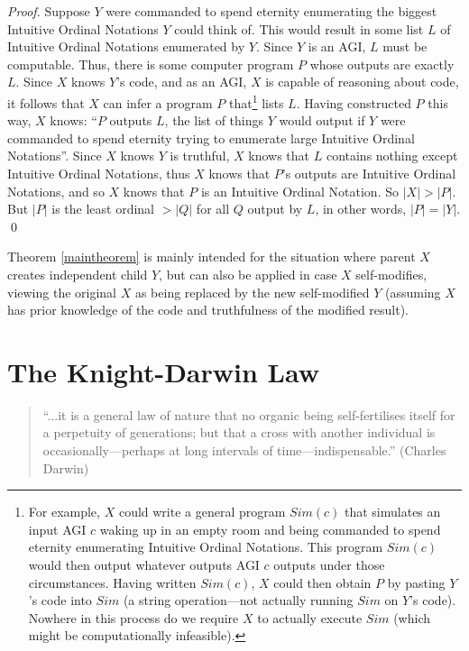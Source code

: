 \documentclass[runningheads]{llncs}
\begin{document}
\begin{proof}
    Suppose $Y$ were commanded to
    spend eternity enumerating the biggest Intuitive Ordinal Notations $Y$ could
    think of. This would result in some list $L$ of Intuitive Ordinal Notations
    enumerated by $Y$. Since $Y$ is an AGI, $L$ must be computable. Thus, there
    is some computer program
    $P$ whose outputs are exactly $L$.
    Since $X$ knows $Y$'s code,
    and as an AGI, $X$ is capable of reasoning about code,
    it follows that $X$ can infer a program $P$ that\footnote{For example,
    $X$ could write a general program $Sim(c)$ that simulates an input AGI $c$
    waking up in an empty room and being commanded
    to spend eternity enumerating Intuitive Ordinal Notations. This program $Sim(c)$
    would then output whatever outputs AGI $c$ outputs under those
    circumstances. Having written $Sim(c)$, $X$ could then obtain $P$ by
    pasting $Y$'s code into $Sim$ (a string operation---not actually running $Sim$
    on $Y$'s code).
    Nowhere in this process do we require $X$ to actually
    execute $Sim$ (which might be computationally infeasible).} lists $L$.
    Having constructed $P$ this way, $X$ knows: ``$P$ outputs
    $L$, the list of things $Y$ would output if $Y$ were commanded to spend eternity
    trying to enumerate large Intuitive Ordinal Notations''.
    Since $X$ knows $Y$ is truthful,
    $X$ knows that $L$ contains nothing except Intuitive Ordinal Notations,
    thus $X$ knows that $P$'s outputs are Intuitive Ordinal Notations,
    and so $X$ knows that $P$ is an Intuitive Ordinal Notation.
    So $|X|>|P|$. But $|P|$ is
    the least ordinal $>|Q|$ for all $Q$ output by $L$, in other words,
    $|P|=|Y|$.
    \qed
\end{proof}

Theorem \ref{maintheorem} is mainly intended for the situation where parent $X$ creates
independent child $Y$, but can also be applied in case $X$ self-modifies,
viewing the original $X$ as being replaced by the new self-modified
$Y$ (assuming $X$ has prior
knowledge of the code and truthfulness of the modified result).

\section{The Knight-Darwin Law}
\label{knightdarwinagisection}

\begin{quote}
``...it is a general law of nature that no organic being self-fertilises itself
for a perpetuity of generations; but that a cross with another individual
is occasionally---perhaps at long intervals of time---indispensable.''
(Charles Darwin)
\end{quote}
\end{document}
